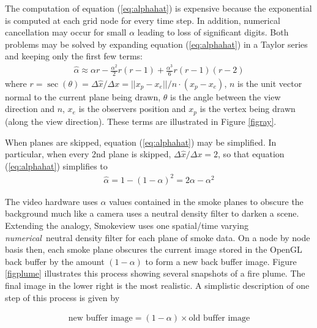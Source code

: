 The computation of equation (\ref{eq:alphahat}) is expensive
because the exponential is computed at each grid node for every
time step.  In addition, numerical cancellation may occur for
small $\alpha$ leading to loss of significant digits. Both
problems may be solved by expanding equation (\ref{eq:alphahat})
in a Taylor series and keeping only the first few terms:
\begin{eqnarray*}
\hat{\alpha}\approx \alpha r -
\frac{\alpha^2}{2}r(r-1)+\frac{\alpha^3}{6}r(r-1)(r-2)
\end{eqnarray*}
where $r=\sec(\theta)=\Delta \hat{x}/\Delta
x=||x_p-x_e||/n\cdot(x_p-x_e)$, $n$ is the unit vector normal to
the current plane being drawn, $\theta$ is the angle between the
view direction and $n$, $x_e$ is the observers position and $x_p$
is the vertex being drawn (along the view direction).  These terms
are illustrated in Figure \ref{figray}.

When planes are skipped, equation (\ref{eq:alphahat}) may be
simplified.  In particular, when every 2nd plane is skipped,
$\Delta\hat{x}/\Delta x=2$, so that equation (\ref{eq:alphahat})
simplifies to
\begin{eqnarray*}
\hat{\alpha}=1-(1-\alpha)^2=2\alpha-\alpha^2
\end{eqnarray*}

The video hardware uses $\alpha$ values contained in the smoke
planes to obscure the background much like a camera uses a neutral
density filter to darken a scene.  Extending the analogy,
Smokeview uses one spatial/time varying {\em numerical}\ neutral
density filter for each plane of smoke data.  On a node by node
basis then, each smoke plane obscures the current image stored in
the OpenGL back buffer by the amount $(1-\alpha)$ to form a new
back buffer image.  Figure \ref{figplume} illustrates this process
showing several snapshots of a fire plume. The final image in the
lower right is the most realistic. A simplistic description of one
step of this process is given by

\begin{eqnarray*}
\mbox{new buffer image} = (1-\alpha)\times \mbox{old buffer image}
\end{eqnarray*}


